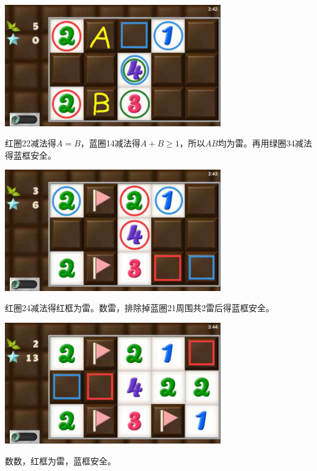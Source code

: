 \subsection{} %
\begin{center}
    \includegraphics[width=0.7\textwidth]{puzzlelow/90-1.jpg}
\end{center}
红圈22减法得$A=B$，蓝圈14减法得$A+B\ge 1$，所以$AB$均为雷。再用绿圈34减法得蓝框安全。
\begin{center}
    \includegraphics[width=0.7\textwidth]{puzzlelow/90-2.jpg}
\end{center}
红圈24减法得红框为雷。数雷，排除掉蓝圈21周围共2雷后得蓝框安全。
\begin{center}
    \includegraphics[width=0.7\textwidth]{puzzlelow/90-3.jpg}
\end{center}
数数，红框为雷，蓝框安全。

